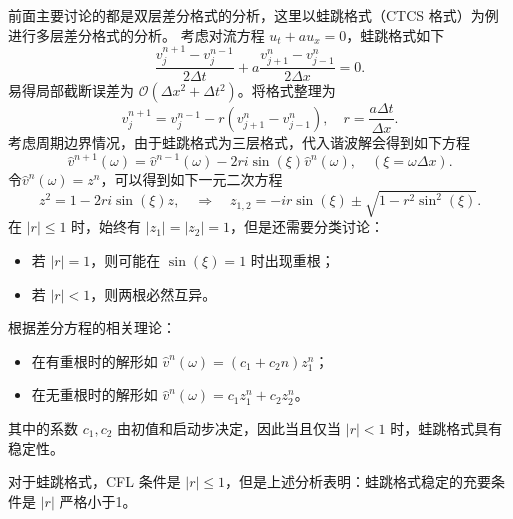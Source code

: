前面主要讨论的都是双层差分格式的分析，这里以蛙跳格式（CTCS 格式）为例进行多层差分格式的分析。
考虑对流方程 $u_t + a u_x = 0$，蛙跳格式如下
\[
    \frac{v_j^{n+1} - v_j^{n-1}}{2\Delta t} + a \frac{v_{j+1}^{n} - v_{j-1}^{n}}{2\Delta x} = 0.
\]
易得局部截断误差为 $\mathcal{O}(\Delta x^2 + \Delta t^2)$。将格式整理为
\[
    v_j^{n+1} = v_j^{n-1} - r (v_{j+1}^n - v_{j-1}^n),\quad r = \frac{a \Delta t}{\Delta x}.
\]
考虑周期边界情况，由于蛙跳格式为三层格式，代入谐波解会得到如下方程
\[
    \hat{v}^{n+1}(\omega) = \hat{v}^{n-1}(\omega) - 2 r i \sin(\xi) \hat{v}^{n}(\omega),\quad (\xi = \omega \Delta x).
\]
令$\hat{v}^n(\omega)=z^n$，可以得到如下一元二次方程
\[
    z^2 = 1 - 2 r i \sin(\xi) z, \quad \Rightarrow \quad z_{1,2} = - i r \sin(\xi) \pm \sqrt{1 - r^2 \sin^2(\xi)}.
\]
在 $|r| \le 1$ 时，始终有 $|z_1| = |z_2| = 1$，但是还需要分类讨论：
\begin{itemize}
    \item 若 $|r| = 1$，则可能在 $\sin(\xi) = 1$ 时出现重根；
    \item 若 $|r| < 1$，则两根必然互异。
\end{itemize}
根据差分方程的相关理论：
\begin{itemize}
    \item 在有重根时的解形如 $\hat{v}^n(\omega) = (c_1 + c_2 n) z_1^n$；
    \item 在无重根时的解形如 $\hat{v}^n(\omega) = c_1 z_1^n + c_2 z_2^n$。
\end{itemize}
其中的系数 $c_1, c_2$ 由初值和启动步决定，因此当且仅当 $|r| < 1$ 时，蛙跳格式具有稳定性。

\begin{remark}
    对于蛙跳格式，CFL 条件是 $|r| \le 1$，但是上述分析表明：蛙跳格式稳定的充要条件是 $|r|$ 严格小于1。
\end{remark}




